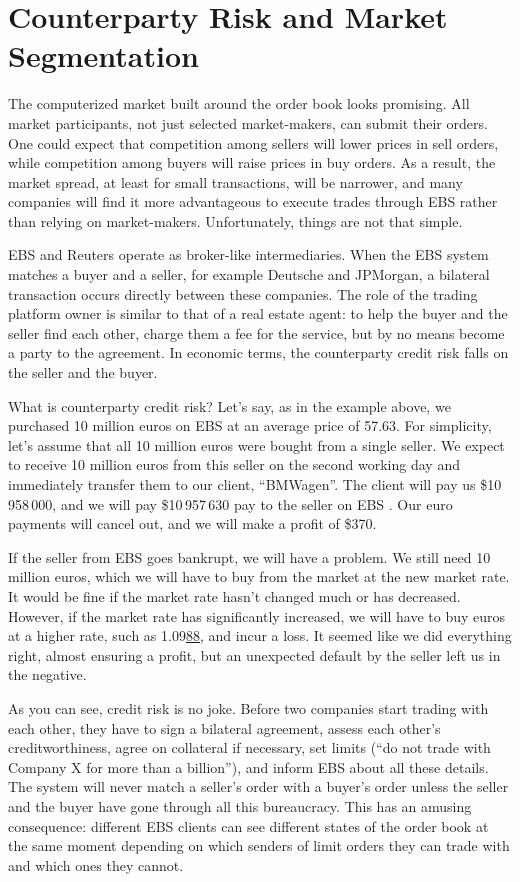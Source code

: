 \documentclass[a4paper,14pt]{extarticle}
\begin{document}
\section*{Counterparty Risk and Market Segmentation}

The computerized market built around the order book looks promising. All 
market participants, not just selected market-makers, can submit their orders. 
One could expect that competition among sellers will lower prices in sell 
orders, while competition among buyers will raise prices in buy orders. As a 
result, the market spread, at least for small transactions, will be narrower, 
and many companies will find it more advantageous to execute trades through EBS 
rather than relying on market-makers. Unfortunately, things are not that simple.

EBS and Reuters operate as broker-like intermediaries. When the EBS system 
matches a buyer and a seller, for example Deutsche and JPMorgan, a bilateral 
transaction occurs directly between these companies. The role of the trading 
platform owner is similar to that of a real estate agent: to help the buyer and 
the seller find each other, charge them a fee for the service, but by 
no means become a party to the agreement. In economic terms, the counterparty 
credit risk falls on the seller and the buyer.

What is counterparty credit risk? Let's say, as in the example above, we 
purchased 10 million euros on EBS at an average price of 57.63. For simplicity, 
let's assume that all 10 million euros were bought from a single seller. We 
expect to receive 10 million euros from this seller on the second working day 
and immediately transfer them to our client, ``BMWagen''. The client will pay us
\$10\,958\,000, and we will pay \$10\,957\,630 pay to the seller on EBS . Our 
euro payments will cancel out, and we will make a profit of \$370. 

If the seller from EBS goes bankrupt, we will have a problem. We still need 10 
million euros, which we will have to buy from the market at the new market rate. 
It would be fine if the market rate hasn't changed much or has decreased. 
However, if the market rate has significantly increased, we will have to buy 
euros at a higher rate, such as 1.09\underline{88}, and incur a loss. It seemed 
like we did everything right, almost ensuring a profit, but an unexpected 
default by the seller left us in the negative.

As you can see, credit risk is no joke. Before two companies start trading with 
each other, they have to sign a bilateral agreement, assess each other's 
creditworthiness, agree on collateral if necessary, set limits (``do not trade 
with Company X for more than a billion''), and inform EBS about all these 
details. The system will never match a seller's order with a buyer's order 
unless the seller and the buyer have gone through all this bureaucracy. This has 
an amusing consequence: different EBS clients can see different states of the 
order book at the same moment depending on which senders of limit orders they 
can trade with and which ones they cannot.
\end{document}

